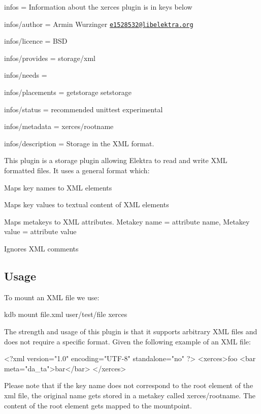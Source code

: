 
\begin{DoxyItemize}
\item infos = Information about the xerces plugin is in keys below
\item infos/author = Armin Wurzinger \href{mailto:e1528532@libelektra.org}{\tt e1528532@libelektra.\+org}
\item infos/licence = B\+SD
\item infos/provides = storage/xml
\item infos/needs =
\item infos/placements = getstorage setstorage
\item infos/status = recommended unittest experimental
\item infos/metadata = xerces/rootname
\item infos/description = Storage in the X\+ML format.
\end{DoxyItemize}

This plugin is a storage plugin allowing Elektra to read and write X\+ML formatted files. It uses a general format which\+:


\begin{DoxyItemize}
\item Maps key names to X\+ML elements
\item Maps key values to textual content of X\+ML elements
\item Maps metakeys to X\+ML attributes. Metakey name = attribute name, Metakey value = attribute value
\item Ignores X\+ML comments
\end{DoxyItemize}

\subsection*{Usage}

To mount an X\+ML file we use\+: \begin{DoxyVerb}    kdb mount file.xml user/test/file xerces
\end{DoxyVerb}


The strength and usage of this plugin is that it supports arbitrary X\+ML files and does not require a specific format. Given the following example of an X\+ML file\+: \begin{DoxyVerb}    <?xml version="1.0" encoding="UTF-8" standalone="no" ?>
    <xerces>foo
      <bar meta="da_ta">bar</bar>
    </xerces>
\end{DoxyVerb}


Please note that if the key name does not correspond to the root element of the xml file, the original name gets stored in a metakey called {\ttfamily xerces/rootname}. The content of the root element gets mapped to the mountpoint.

